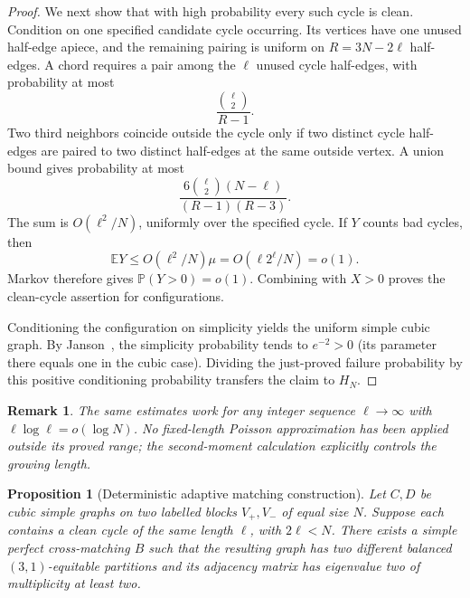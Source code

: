 \documentclass[11pt]{article}
\newtheorem{proposition}[theorem]{Proposition}
\newtheorem{remark}[theorem]{Remark}
\newcommand{\E}{\mathbb E}
\newcommand{\Prob}{\mathbb P}
\begin{document}
\begin{proof}
We next show that with high probability every such cycle is clean.
Condition on one specified candidate cycle occurring. Its vertices have
one unused half-edge apiece, and the remaining pairing is uniform on
$R=3N-2\ell$ half-edges. A chord requires a pair among the $\ell$
unused cycle half-edges, with probability at most
\[
                         \frac{\binom\ell2}{R-1}.
\]
Two third neighbors coincide outside the cycle only if two distinct
cycle half-edges are paired to two distinct half-edges at the same
outside vertex. A union bound gives probability at most
\[
             \frac{6\binom\ell2(N-\ell)}{(R-1)(R-3)}.
\]
The sum is $O(\ell^2/N)$, uniformly over the specified cycle. If $Y$
counts bad cycles, then
\[
       \E Y\le O(\ell^2/N)\mu
                  =O(\ell2^\ell/N)=o(1).
\]
Markov therefore gives $\Prob(Y>0)=o(1)$. Combining with $X>0$ proves
the clean-cycle assertion for configurations.

Conditioning the configuration on simplicity yields the uniform simple
cubic graph. By Janson~\cite[Corollary 1.5]{janson}, the simplicity
probability tends to $e^{-2}>0$ (its parameter there equals one in the
cubic case). Dividing the just-proved failure probability by this
positive conditioning probability transfers the claim to $H_N$.
\end{proof}

\begin{remark}
The same estimates work for any integer sequence $\ell\to\infty$ with
$\ell\log\ell=o(\log N)$. No fixed-length Poisson approximation has
been applied outside its proved range; the second-moment calculation
explicitly controls the growing length.
\end{remark}

\begin{proposition}[Deterministic adaptive matching construction]
\label{prop:matching}
Let $C,D$ be cubic simple graphs on two labelled blocks $V_+,V_-$ of
equal size $N$. Suppose each contains a clean cycle of the same length
$\ell$, with $2\ell<N$. There exists a simple perfect cross-matching
$B$ such that the resulting graph has two different balanced
$(3,1)$-equitable partitions and its adjacency matrix has eigenvalue two
of multiplicity at least two.
\end{proposition}
\end{document}
